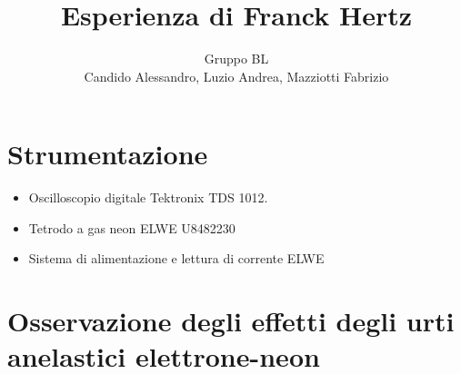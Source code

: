\documentclass[a4paper,10pt]{article}
\title{Esperienza di Franck Hertz}
\author{Gruppo BL \\ Candido Alessandro, Luzio Andrea, Mazziotti Fabrizio}
\begin{document}
\maketitle

\section{Strumentazione }%
\begin{itemize}
 \item Oscilloscopio digitale Tektronix TDS 1012. \newline
 \item Tetrodo a gas neon ELWE U8482230
 \item Sistema di alimentazione e lettura di corrente ELWE

\end{itemize}

\section{Osservazione degli effetti degli urti anelastici elettrone-neon}
\end{document}
